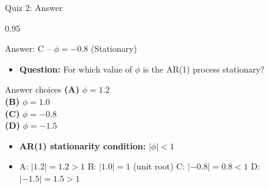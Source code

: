 \documentclass[9pt, aspectratio=169, t]{beamer}
\begin{document}
\begin{frame}{Quiz 2: Answer}
    \begin{cminipage}{0.95\textwidth}
    \begin{exampleblock}{Answer: C -- $\phi = -0.8$ (Stationary)}
        \begin{itemize}\setlength{\itemsep}{0pt}
            \item \textbf{Question:} For which value of $\phi$ is the AR(1) process stationary?
        \end{itemize}

        \vspace{0.3cm}

    \begin{block}{Answer choices}
        \textcolor{MainBlue}{\textbf{(A)}} $\phi = 1.2$ \incorrect\\[3pt]
        \textcolor{MainBlue}{\textbf{(B)}} $\phi = 1.0$ \incorrect\\[3pt]
        \textcolor{MainBlue}{\textbf{(C)}} \textbf{\textcolor{Forest}{$\phi = -0.8$}} \correct\\[3pt]
        \textcolor{MainBlue}{\textbf{(D)}} $\phi = -1.5$ \incorrect
    \end{block}

        \vspace{0.3cm}

        \begin{itemize}
            \item \textbf{AR(1) stationarity condition:} $|\phi| < 1$
            \item A: $|1.2| = 1.2 > 1$ \quad B: $|1.0| = 1$ (unit root) \quad C: $|-0.8| = 0.8 < 1$ \quad D: $|-1.5| = 1.5 > 1$
        \end{itemize}
    \end{exampleblock}

    \end{cminipage}
\end{frame}
\end{document}
